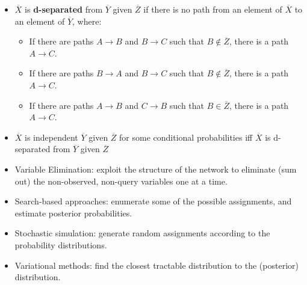 \documentclass[12pt]{beamer} %
\begin{document}

\begin{slide}
\begin{itemize}
\item
$\overline{X}$ is \textbf{d-separated} from $\overline{Y}$ given $\overline{Z}$
if there is no path from an element of $\overline{X}$ to an element of
$\overline{Y}$,
where:
\begin{itemize}
\item If there are paths $A \rightarrow B$ and $B \rightarrow C$ such
that $B \not \in \overline{Z}$, there is a path $A\rightarrow C$.
\item If there are paths $B\rightarrow A$ and $B \rightarrow C$ such
that $B \not \in \overline{Z}$, there is a path $A \rightarrow C$.
\item If there are paths $A \rightarrow B$ and $C \rightarrow B$ such
that $B \in \overline{Z}$, there is a path $A \rightarrow C$.
\end{itemize}
\item $\overline{X}$ is independent $\overline{Y}$ given
$\overline{Z}$ for some conditional probabilities iff $\overline{X}$ is d-separated from $\overline{Y}$
given $\overline{Z}$
\end{itemize}

\end{slide}
\fi






\newcommand{\smeq}{\,{=}\,}

\begin{slide}
\begin{itemize}
\item Variable Elimination: exploit the structure of the network to eliminate (sum out) the
non-observed, non-query variables one at a time.
\item Search-based approaches: enumerate some of the
possible assignments, and estimate posterior probabilities.
\item Stochastic simulation: generate random assignments according to the probability distributions.
\item Variational methods: find the closest tractable
  distribution to the (posterior) distribution.
\end{itemize}
\end{slide}
\end{document}
